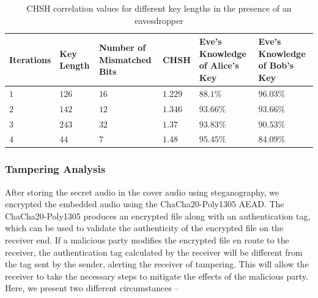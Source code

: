 \documentclass[a4paper]{cas-sc}
\begin{document}
\begin{table}[pos=h]
    \begin{center}
        \caption{CHSH correlation values for different key lengths in the presence of an eavesdropper}
        \begin{tabularx}{\textwidth}{>{\centering\arraybackslash}X>{\centering\arraybackslash}X>{\centering\arraybackslash}X>{\centering\arraybackslash}X>{\centering\arraybackslash}X>{\centering\arraybackslash}X}
            \hline
            Iterations & Key Length & Number of Mismatched Bits & CHSH    & Eve's Knowledge of Alice's Key & Eve's Knowledge of Bob's Key \\ \hline
            $1$        & $126$      & $16$                      & $1.229$ & $88.1\%$                       & $96.03\%$                    \\
            $2$        & $142$      & $12$                      & $1.346$ & $93.66\%$                      & $93.66\%$                    \\
            $3$        & $243$      & $32$                      & $1.37$  & $93.83\%$                      & $90.53\%$                    \\
            $4$        & $44$       & $7$                       & $1.48$  & $95.45\%$                      & $84.09\%$                    \\
            \hline
        \end{tabularx}
        \label{table:chshEveKnowledge}
    \end{center}
\end{table}
\subsubsection{Tampering Analysis}
After storing the secret audio in the cover audio using steganography, we encrypted the embedded audio using the ChaCha20-Poly1305 AEAD. The ChaCha20-Poly1305 produces an encrypted file along with an authentication tag, which can be used to validate the authenticity of the encrypted file on the receiver end. If a malicious party modifies the encrypted file en route to the receiver, the authentication tag calculated by the receiver will be different from the tag sent by the sender, alerting the receiver of tampering. This will allow the receiver to take the necessary steps to mitigate the effects of the malicious party. Here, we present two different circumstances --
\end{document}
